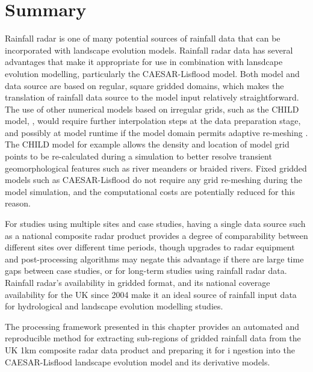 \section{Summary}
Rainfall radar is one of many potential sources of rainfall data that can be incorporated with landscape evolution models. Rainfall radar data has several advantages that make it appropriate for use in combination with lansdcape evolution modelling, particularly the CAESAR-Lisflood model. Both model and data source are based on regular, square gridded domains, which makes the translation of rainfall data source to the model input relatively straightforward. The use of other numerical models based on irregular grids, such as the CHILD model,  \citep{Tucker2001}, would require further interpolation steps at the data preparation stage, and possibly at model runtime if the model domain permits adaptive re-meshing \citep{clevis2006simple, tucker2001child}. The CHILD model for example allows the density and location of model grid points to be re-calculated during a simulation to better resolve transient geomorphological features such as river meanders or braided rivers. Fixed gridded models such as CAESAR-Lisflood do not require any grid re-meshing during the model simulation, and the computational costs are potentially reduced for this reason.

For studies using multiple sites and case studies, having a single data source such as a national composite radar product provides a degree of comparability between different sites over different time periods, though upgrades to radar equipment and post-processing algorithms \citep[e.g.][]{harrison2012radar} may negate this advantage if there are large time gaps between case studies, or for long-term studies using rainfall radar data. Rainfall radar's availability in gridded format, and its national coverage availability for the UK since 2004 make it an ideal source of rainfall input data for hydrological and landscape evolution modelling studies. 

The processing framework presented in this chapter provides an automated and reproducible method for extracting sub-regions of gridded rainfall data from the UK 1km composite radar data product and preparing it for i ngestion into the CAESAR-Lisflood landscape evolution model and its derivative models.


